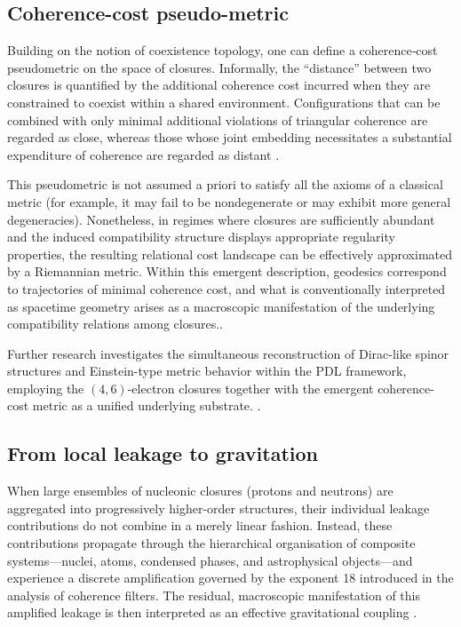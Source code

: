 \documentclass{article}
\begin{document}
\subsection{Coherence-cost pseudo-metric}
\label{subsec:coherence_metric}

Building on the notion of coexistence topology, one can define a coherence‑cost pseudometric on the space of closures. Informally, the “distance” between two closures is quantified by the additional coherence cost incurred when they are constrained to coexist within a shared environment. Configurations that can be combined with only minimal additional violations of triangular coherence are regarded as close, whereas those whose joint embedding necessitates a substantial expenditure of coherence are regarded as distant \cite{Coherence_Leakage_18_2026}.

This pseudometric is not assumed a priori to satisfy all the axioms of a classical metric (for example, it may fail to be nondegenerate or may exhibit more general degeneracies). Nonetheless, in regimes where closures are sufficiently abundant and the induced compatibility structure displays appropriate regularity properties, the resulting relational cost landscape can be effectively approximated by a Riemannian metric. Within this emergent description, geodesics correspond to trajectories of minimal coherence cost, and what is conventionally interpreted as spacetime geometry arises as a macroscopic manifestation of the underlying compatibility relations among closures.\cite{PDL_Main_2026,PDL_position}. 

Further research investigates the simultaneous reconstruction of Dirac-like spinor structures and Einstein-type metric behavior within the PDL framework, employing the \((4,6)\)-electron closures together with the emergent coherence-cost metric as a unified underlying substrate. \cite{Einstein_Dirac_PDL_2026}.

\subsection{From local leakage to gravitation}
\label{subsec:leakage_gravity}

When large ensembles of nucleonic closures (protons and neutrons) are aggregated into progressively higher-order structures, their individual leakage contributions do not combine in a merely linear fashion. Instead, these contributions propagate through the hierarchical organisation of composite systems—nuclei, atoms, condensed phases, and astrophysical objects—and experience a discrete amplification governed by the exponent 18 introduced in the analysis of coherence filters. The residual, macroscopic manifestation of this amplified leakage is then interpreted as an effective gravitational coupling \cite{Exponent_18_PDL_2026,PDL_Main_2026}.
\end{document}
